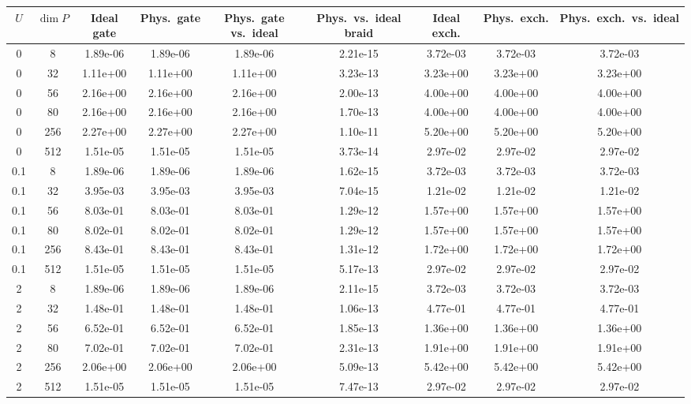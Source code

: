 \begin{tabular}{ccccccccc}
\hline
$U$ & $\dim P$ & Ideal gate & Phys.\ gate & Phys.\ gate vs.\ ideal & Phys.\ vs.\ ideal braid & Ideal exch. & Phys.\ exch. & Phys.\ exch.\ vs.\ ideal \\
\hline
0 & 8 & 1.89e-06 & 1.89e-06 & 1.89e-06 & 2.21e-15 & 3.72e-03 & 3.72e-03 & 3.72e-03 \\
0 & 32 & 1.11e+00 & 1.11e+00 & 1.11e+00 & 3.23e-13 & 3.23e+00 & 3.23e+00 & 3.23e+00 \\
0 & 56 & 2.16e+00 & 2.16e+00 & 2.16e+00 & 2.00e-13 & 4.00e+00 & 4.00e+00 & 4.00e+00 \\
0 & 80 & 2.16e+00 & 2.16e+00 & 2.16e+00 & 1.70e-13 & 4.00e+00 & 4.00e+00 & 4.00e+00 \\
0 & 256 & 2.27e+00 & 2.27e+00 & 2.27e+00 & 1.10e-11 & 5.20e+00 & 5.20e+00 & 5.20e+00 \\
0 & 512 & 1.51e-05 & 1.51e-05 & 1.51e-05 & 3.73e-14 & 2.97e-02 & 2.97e-02 & 2.97e-02 \\
\hline
0.1 & 8 & 1.89e-06 & 1.89e-06 & 1.89e-06 & 1.62e-15 & 3.72e-03 & 3.72e-03 & 3.72e-03 \\
0.1 & 32 & 3.95e-03 & 3.95e-03 & 3.95e-03 & 7.04e-15 & 1.21e-02 & 1.21e-02 & 1.21e-02 \\
0.1 & 56 & 8.03e-01 & 8.03e-01 & 8.03e-01 & 1.29e-12 & 1.57e+00 & 1.57e+00 & 1.57e+00 \\
0.1 & 80 & 8.02e-01 & 8.02e-01 & 8.02e-01 & 1.29e-12 & 1.57e+00 & 1.57e+00 & 1.57e+00 \\
0.1 & 256 & 8.43e-01 & 8.43e-01 & 8.43e-01 & 1.31e-12 & 1.72e+00 & 1.72e+00 & 1.72e+00 \\
0.1 & 512 & 1.51e-05 & 1.51e-05 & 1.51e-05 & 5.17e-13 & 2.97e-02 & 2.97e-02 & 2.97e-02 \\
\hline
2 & 8 & 1.89e-06 & 1.89e-06 & 1.89e-06 & 2.11e-15 & 3.72e-03 & 3.72e-03 & 3.72e-03 \\
2 & 32 & 1.48e-01 & 1.48e-01 & 1.48e-01 & 1.06e-13 & 4.77e-01 & 4.77e-01 & 4.77e-01 \\
2 & 56 & 6.52e-01 & 6.52e-01 & 6.52e-01 & 1.85e-13 & 1.36e+00 & 1.36e+00 & 1.36e+00 \\
2 & 80 & 7.02e-01 & 7.02e-01 & 7.02e-01 & 2.31e-13 & 1.91e+00 & 1.91e+00 & 1.91e+00 \\
2 & 256 & 2.06e+00 & 2.06e+00 & 2.06e+00 & 5.09e-13 & 5.42e+00 & 5.42e+00 & 5.42e+00 \\
2 & 512 & 1.51e-05 & 1.51e-05 & 1.51e-05 & 7.47e-13 & 2.97e-02 & 2.97e-02 & 2.97e-02 \\
\hline
\end{tabular}
